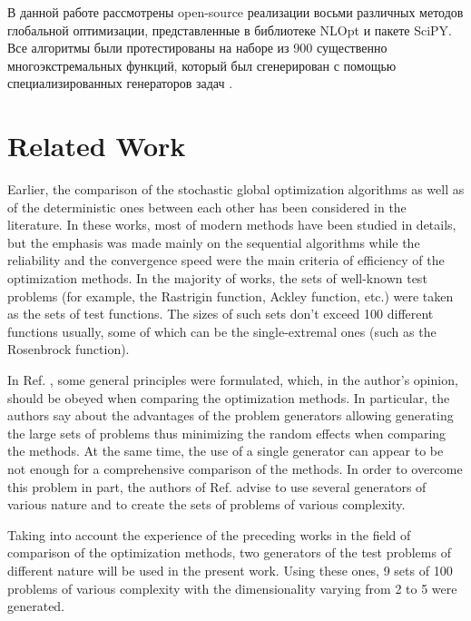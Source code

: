\documentclass[runningheads]{llncs}
\begin{document}
В данной работе рассмотрены open-source реализации восьми различных методов глобальной оптимизации, представленные
в библиотеке NLOpt\cite{nlopt} и пакете SciPY\cite{scipy}.
Все алгоритмы были протестированы на наборе из 900 существенно многоэкстремальных функций, который был сгенерирован с
помощью специализированных генераторов задач \cite{Gaviano2003, grishaginClass}.

\section{Related Work}

Earlier, the comparison of the stochastic global optimization algorithms \cite{Ali2005, JSSv060i06}
as well as of the deterministic ones \cite{posik2012, KVASOV2018245, Liberti2005} between each
other has been considered in the literature. In these works, most of modern methods have
been studied in details, but the emphasis was made mainly on the sequential algorithms while the
reliability and the convergence speed were the main criteria of efficiency of the optimization
methods. In the majority of works, the sets of well-known test problems (for example, the Rastrigin
function, Ackley function, etc.) were taken as the sets of test functions. The sizes of such sets don't
exceed 100 different functions usually, some of which can be the single-extremal ones (such as the
Rosenbrock function).

In Ref. \cite{Beiranvand2017}, some general principles were formulated, which, in the author's
opinion, should be obeyed when comparing the optimization methods. In particular, the authors say
about the advantages of the problem generators allowing generating the large sets of problems thus
minimizing the random effects when comparing the methods. At the same time, the use of a single
generator can appear to be not enough for a comprehensive comparison of the methods. In order to
overcome this problem in part, the authors of Ref. \cite{Beiranvand2017} advise to use several
generators of various nature and to create the sets of problems of various complexity.

Taking into account the experience of the preceding works in the field of comparison of the
optimization methods, two generators of the test problems of different nature will be used in the
present work. Using these ones, 9 sets of 100 problems of various complexity with the
dimensionality varying from 2 to 5 were generated.
\end{document}
